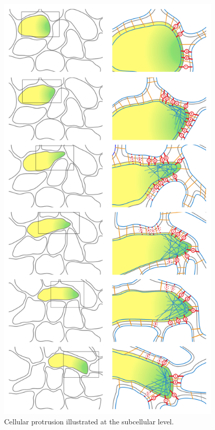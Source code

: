 \begin{figure}
\begin{center}
\includegraphics[width=0.95\textwidth]{../../images/MECAGEN/protrusion/multicell_white_rec_figure.png}
\end{center}
\caption{Cellular protrusion illustrated at the subcellular level.}
\label{protrusion_multicell_white_rec_figure}
\end{figure}

